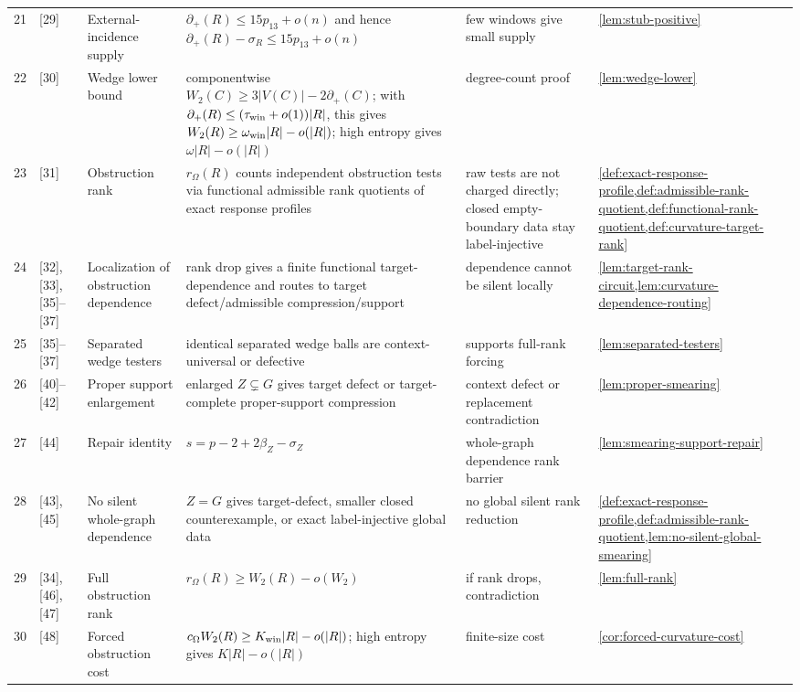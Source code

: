 \documentclass[11pt]{article}
\newcommand{\defp}{\partial_+}
\begin{document}
{\begin{longtable}{C{0.04\textwidth} L{0.13\textwidth} L{0.17\textwidth} L{0.25\textwidth} L{0.21\textwidth} L{0.12\textwidth}}
21 & [29] & External-incidence supply & $\defp(R)\le15p_{13}+o(n)$ and hence $\defp(R)-\sigma_R\le15p_{13}+o(n)$ & few windows give small supply & \cref{lem:stub-positive} \\
22 & [30] & Wedge lower bound & componentwise \(W_2(C)\ge3|V(C)|-2\defp(C)\); with \(\defp(R)\le(\tau_{\rm win}+o(1))|R|\), this gives \(W_2(R)\ge\omega_{\rm win}|R|-o(|R|)\); high entropy gives \(\omega|R|-o(|R|)\) & degree-count proof & \cref{lem:wedge-lower} \\
23 & [31] & Obstruction rank & $r_\Omega(R)$ counts independent obstruction tests via functional admissible rank quotients of exact response profiles & raw tests are not charged directly; closed empty-boundary data stay label-injective & \cref{def:exact-response-profile,def:admissible-rank-quotient,def:functional-rank-quotient,def:curvature-target-rank} \\
24 & [32], [33], [35]--[37] & Localization of obstruction dependence & rank drop gives a finite functional target-dependence and routes to target defect/admissible compression/support & dependence cannot be silent locally & \cref{lem:target-rank-circuit,lem:curvature-dependence-routing} \\
25 & [35]--[37] & Separated wedge testers & identical separated wedge balls are context-universal or defective & supports full-rank forcing & \cref{lem:separated-testers} \\
26 & [40]--[42] & Proper support enlargement & enlarged $Z\subsetneq G$ gives target defect or target-complete proper-support compression & context defect or replacement contradiction & \cref{lem:proper-smearing} \\
27 & [44] & Repair identity & $s=p-2+2\beta_Z-\sigma_Z$ & whole-graph dependence rank barrier & \cref{lem:smearing-support-repair} \\
28 & [43], [45] & No silent whole-graph dependence & $Z=G$ gives target-defect, smaller closed counterexample, or exact label-injective global data & no global silent rank reduction & \cref{def:exact-response-profile,def:admissible-rank-quotient,lem:no-silent-global-smearing} \\
29 & [34], [46], [47] & Full obstruction rank & $r_\Omega(R)\ge W_2(R)-o(W_2)$ & if rank drops, contradiction & \cref{lem:full-rank} \\
30 & [48] & Forced obstruction cost & $c_\Omega W_2(R)\ge K_{\rm win}|R|-o(|R|)$; high entropy gives $K|R|-o(|R|)$ & finite-size cost & \cref{cor:forced-curvature-cost} \\

\end{longtable}}
\end{document}
